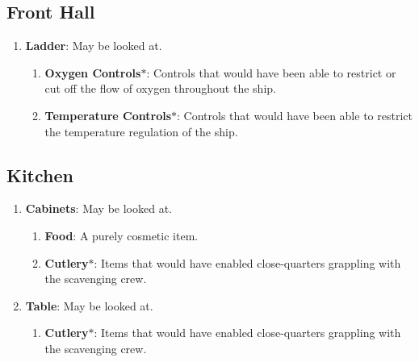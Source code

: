 \documentclass[12pt]{article}
\begin{document}


\subsection{Front Hall}

\begin{enumerate}
  \item \textbf{Ladder}: May be looked at.
  \begin{enumerate}
    \item \textbf{Oxygen Controls}$\ast$: Controls that would have been able to
      restrict or cut off the flow of oxygen throughout the ship.
    \item \textbf{Temperature Controls}$\ast$: Controls that would have been
      able to restrict the temperature regulation of the ship.
  \end{enumerate}
\end{enumerate}



\subsection{Kitchen}

\begin{enumerate}
  \item \textbf{Cabinets}: May be looked at.
  \begin{enumerate}
    \item \textbf{Food}: A purely cosmetic item.
    \item \textbf{Cutlery}$\ast$: Items that would have enabled close-quarters
      grappling with the scavenging crew.
  \end{enumerate}
  \item \textbf{Table}: May be looked at.
  \begin{enumerate}
    \item \textbf{Cutlery}$\ast$: Items that would have enabled close-quarters
      grappling with the scavenging crew.
  \end{enumerate}
\end{enumerate}


\end{document}
